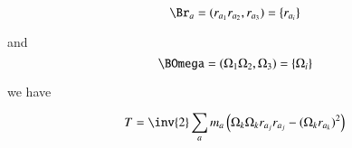 \begin{equation}\label{eqn:rigidBodyMotion:460}
\Br_a = ( r_{a_1} r_{a_2}, r_{a_3} ) = \{ r_{a_i} \}
\end{equation}

and 
\begin{equation}\label{eqn:rigidBodyMotion:480}
\BOmega = ( \Omega_{1} \Omega_{2}, \Omega_{3} ) = \{ \Omega_{i} \}
\end{equation}

we have

\begin{equation}\label{eqn:rigidBodyMotion:500}
T = \inv{2} \sum_a m_a \left( \Omega_k \Omega_k r_{a_j} r_{a_j} - (\Omega_k r_{a_k})^2
\right)
\end{equation}

\EndNoBibArticle
